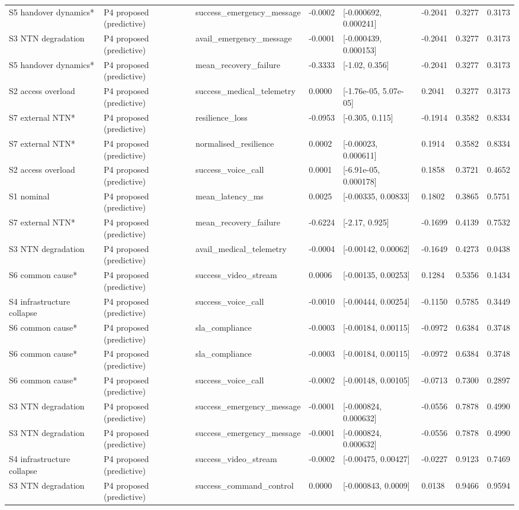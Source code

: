 \begin{tabular}{llllllll}
S5 handover dynamics* & P4 proposed (predictive) & success\_emergency\_message & -0.0002 & [-0.000692, 0.000241] & -0.2041 & 0.3277 & 0.3173 \\
S3 NTN degradation & P4 proposed (predictive) & avail\_emergency\_message & -0.0001 & [-0.000439, 0.000153] & -0.2041 & 0.3277 & 0.3173 \\
S5 handover dynamics* & P4 proposed (predictive) & mean\_recovery\_failure & -0.3333 & [-1.02, 0.356] & -0.2041 & 0.3277 & 0.3173 \\
S2 access overload & P4 proposed (predictive) & success\_medical\_telemetry & 0.0000 & [-1.76e-05, 5.07e-05] & 0.2041 & 0.3277 & 0.3173 \\
S7 external NTN* & P4 proposed (predictive) & resilience\_loss & -0.0953 & [-0.305, 0.115] & -0.1914 & 0.3582 & 0.8334 \\
S7 external NTN* & P4 proposed (predictive) & normalised\_resilience & 0.0002 & [-0.00023, 0.000611] & 0.1914 & 0.3582 & 0.8334 \\
S2 access overload & P4 proposed (predictive) & success\_voice\_call & 0.0001 & [-6.91e-05, 0.000178] & 0.1858 & 0.3721 & 0.4652 \\
S1 nominal & P4 proposed (predictive) & mean\_latency\_ms & 0.0025 & [-0.00335, 0.00833] & 0.1802 & 0.3865 & 0.5751 \\
S7 external NTN* & P4 proposed (predictive) & mean\_recovery\_failure & -0.6224 & [-2.17, 0.925] & -0.1699 & 0.4139 & 0.7532 \\
S3 NTN degradation & P4 proposed (predictive) & avail\_medical\_telemetry & -0.0004 & [-0.00142, 0.00062] & -0.1649 & 0.4273 & 0.0438 \\
S6 common cause* & P4 proposed (predictive) & success\_video\_stream & 0.0006 & [-0.00135, 0.00253] & 0.1284 & 0.5356 & 0.1434 \\
S4 infrastructure collapse & P4 proposed (predictive) & success\_voice\_call & -0.0010 & [-0.00444, 0.00254] & -0.1150 & 0.5785 & 0.3449 \\
S6 common cause* & P4 proposed (predictive) & sla\_compliance & -0.0003 & [-0.00184, 0.00115] & -0.0972 & 0.6384 & 0.3748 \\
S6 common cause* & P4 proposed (predictive) & sla\_compliance & -0.0003 & [-0.00184, 0.00115] & -0.0972 & 0.6384 & 0.3748 \\
S6 common cause* & P4 proposed (predictive) & success\_voice\_call & -0.0002 & [-0.00148, 0.00105] & -0.0713 & 0.7300 & 0.2897 \\
S3 NTN degradation & P4 proposed (predictive) & success\_emergency\_message & -0.0001 & [-0.000824, 0.000632] & -0.0556 & 0.7878 & 0.4990 \\
S3 NTN degradation & P4 proposed (predictive) & success\_emergency\_message & -0.0001 & [-0.000824, 0.000632] & -0.0556 & 0.7878 & 0.4990 \\
S4 infrastructure collapse & P4 proposed (predictive) & success\_video\_stream & -0.0002 & [-0.00475, 0.00427] & -0.0227 & 0.9123 & 0.7469 \\
S3 NTN degradation & P4 proposed (predictive) & success\_command\_control & 0.0000 & [-0.000843, 0.0009] & 0.0138 & 0.9466 & 0.9594 \\
\bottomrule
\end{tabular}
